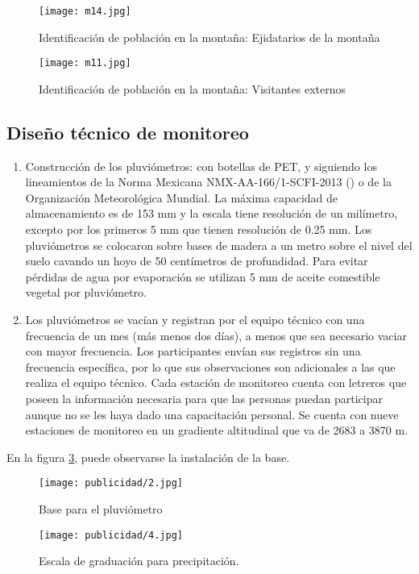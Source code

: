 \begin{figure}[h!]
\centering
  \texttt{[image: m14.jpg]}
  \caption{Identificación de población en la montaña: Ejidatarios de la montaña}
  \label{m14}
\end{figure}

\begin{figure}[h!]
\centering
  \texttt{[image: m11.jpg]}
  \caption{Identificación de población en la montaña: Visitantes externos}
  \label{m11}
\end{figure}


\newpage
\subsection{Diseño técnico de monitoreo}


\begin{enumerate}
    \item Construcción de los pluviómetros: con botellas de PET, y siguiendo los lineamientos de la Norma Mexicana NMX-AA-166/1-SCFI-2013 (\cite{se2013}) o de la Organización Meteorológica Mundial. La máxima capacidad de almacenamiento es de 153 mm y la escala tiene resolución de un milímetro, excepto por los primeros 5 mm que tienen resolución de 0.25 mm. Los pluviómetros se colocaron sobre bases de madera a un metro sobre el nivel del suelo cavando un hoyo de 50 centímetros de profundidad. Para evitar pérdidas de agua por evaporación se utilizan 5 mm de aceite comestible vegetal por pluviómetro.

    \item Los pluviómetros se vacían y registran por el equipo técnico con una frecuencia de un mes (más menos dos días), a menos que sea necesario vaciar con mayor frecuencia. Los participantes envían sus registros sin una frecuencia específica, por lo que sus observaciones son adicionales a las que realiza el equipo técnico. Cada estación de monitoreo cuenta con letreros que poseen la información necesaria para que las personas puedan participar aunque no se les haya dado una capacitación personal. Se cuenta con nueve estaciones de monitoreo en un gradiente altitudinal que va de 2683 a 3870 m. 
\end{enumerate}

En la figura \ref{publicidad2}, puede observarse la instalación de la base.

\begin{figure}[ht]
\centering
  \texttt{[image: publicidad/2.jpg]}
  \caption{Base para el pluviómetro}
  \label{publicidad2}
\end{figure}
\begin{figure}[ht]
\centering
  \texttt{[image: publicidad/4.jpg]}
  \caption{Escala de graduación para precipitación.}
		\label{publicidad4}
\end{figure}


